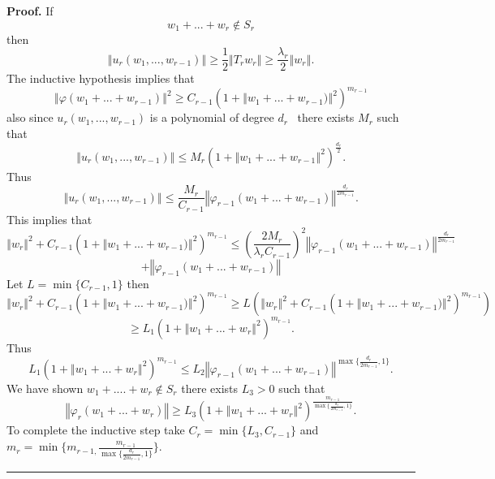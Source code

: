 \documentclass[10pt,a4paper]{amsart}
\newenvironment{proof}[1][Proof]{\noindent\textbf{#1.} }{\ \rule{0.5em}{0.5em}}
\begin{document}
\begin{proof}
If
\[
w_{1}+...+w_{r}\notin S_{r}
\]
then%
\[
\left\Vert u_{r}(w_{1},...,w_{r-1})\right\Vert \geq\frac{1}{2}\left\Vert
T_{r}w_{r}\right\Vert \geq\frac{\lambda_{r}}{2}\left\Vert w_{r}\right\Vert .
\]
The inductive hypothesis implies that
\[
\left\Vert \varphi(w_{1}+...+w_{r-1})\right\Vert ^{2}\geq C_{r-1}(1+\left\Vert
w_{1}+...+w_{r-1})\right\Vert ^{2})^{m_{r-1}}
\]
also since $u_{r}(w_{1},...,w_{r-1})$ is a polynomial of degree $d_{r}$
\ there exists $M_{r}$ such that
\[
\left\Vert u_{r}(w_{1},...,w_{r-1})\right\Vert \leq M_{r}(1+\left\Vert
w_{1}+...+w_{r-1}\right\Vert ^{2})^{\frac{d_{r}}{2}}.
\]
Thus
\[
\left\Vert u_{r}(w_{1},...,w_{r-1})\right\Vert \leq\frac{M_{r}}{C_{r-1}%
}\left\Vert \varphi_{r-1}(w_{1}+...+w_{r-1})\right\Vert ^{\frac{d_{r}%
}{2m_{r-1}}}.
\]
This implies that
\[
\left\Vert w_{r}\right\Vert ^{2}+C_{r-1}(1+\left\Vert w_{1}+...+w_{r-1}%
)\right\Vert ^{2})^{m_{r-1}}\leq\left(  \frac{2M_{r}}{\lambda_{r}C_{r-1}%
}\right)  ^{2}\left\Vert \varphi_{r-1}(w_{1}+...+w_{r-1})\right\Vert
^{\frac{d_{r}}{2m_{r-1}}}
\]%
\[
+\left\Vert \varphi_{r-1}(w_{1}+...+w_{r-1})\right\Vert
\]
Let $L=\min\{C_{r-1},1\}$ then
\[
\left\Vert w_{r}\right\Vert ^{2}+C_{r-1}(1+\left\Vert w_{1}+...+w_{r-1}%
)\right\Vert ^{2})^{m_{r-1}}\geq L(\left\Vert w_{r}\right\Vert ^{2}%
+C_{r-1}(1+\left\Vert w_{1}+...+w_{r-1})\right\Vert ^{2})^{m_{r-1}})
\]%
\[
\geq L_{1}(1+\left\Vert w_{1}+...+w_{r}\right\Vert ^{2})^{m_{r-1}}.
\]
Thus
\[
L_{1}(1+\left\Vert w_{1}+...+w_{r}\right\Vert ^{2})^{m_{r-1}}\leq
L_{2}\left\Vert \varphi_{r-1}(w_{1}+...+w_{r-1})\right\Vert ^{\max
\{\frac{d_{r}}{2m_{r-1}},1\}}.
\]
We have shown $w_{1}+....+w_{r}\notin S_{r}$ there exists $L_{3}>0$ such that%
\[
\left\Vert \varphi_{r}(w_{1}+...+w_{r})\right\Vert \geq L_{3}(1+\left\Vert
w_{1}+...+w_{r}\right\Vert ^{2})^{\frac{m_{r-1}}{\max\{\frac{d_{r}}{2m_{r-1}%
},1\}}}.
\]
To complete the inductive step take $C_{r}=\min\{L_{3},C_{r-1}\}$ and
$m_{r}=\min\{m_{r-1,}\frac{m_{r-1}}{\max\{\frac{d_{r}}{2m_{r-1}},1\}}\}$.
\end{proof}
\end{document}
